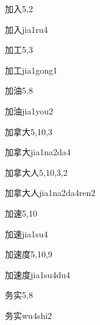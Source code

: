 \begin{entry}{加入}{5,2}
  \begin{phonetics}{加入}{jia1ru4}
  \end{phonetics}
\end{entry}

\begin{entry}{加工}{5,3}
  \begin{phonetics}{加工}{jia1gong1}
  \end{phonetics}
\end{entry}

\begin{entry}{加油}{5,8}
  \begin{phonetics}{加油}{jia1you2}
  \end{phonetics}
\end{entry}

\begin{entry}{加拿大}{5,10,3}
  \begin{phonetics}{加拿大}{jia1na2da4}
  \end{phonetics}
\end{entry}

\begin{entry}{加拿大人}{5,10,3,2}
  \begin{phonetics}{加拿大人}{jia1na2da4ren2}
  \end{phonetics}
\end{entry}

\begin{entry}{加速}{5,10}
  \begin{phonetics}{加速}{jia1su4}
  \end{phonetics}
\end{entry}

\begin{entry}{加速度}{5,10,9}
  \begin{phonetics}{加速度}{jia1su4du4}
  \end{phonetics}
\end{entry}

\begin{entry}{务实}{5,8}
  \begin{phonetics}{务实}{wu4shi2}
  \end{phonetics}
\end{entry}

